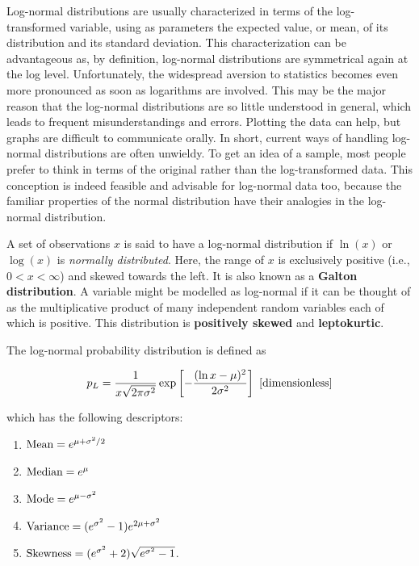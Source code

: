 \documentclass[a4paper,10pt]{article}
\begin{document}
{\noindent}Log-normal distributions are usually characterized in terms of the log-transformed variable, using as parameters the expected value, or mean, of its distribution and its standard deviation. This characterization can be advantageous as, by definition, log-normal distributions are symmetrical again at the log level. Unfortunately, the widespread aversion to statistics becomes even more pronounced as soon as logarithms are involved. This may be the major reason that the log-normal distributions are so little understood in general, which leads to frequent misunderstandings and errors. Plotting the data can help, but graphs are difficult to communicate orally. In short, current ways of handling log-normal distributions are often unwieldy. To get an idea of a sample, most people prefer to think in terms of the original rather than the log-transformed data. This conception is indeed feasible and advisable for log-normal data too, because the familiar properties of the normal distribution have their analogies in the log-normal distribution.

{\noindent}A set of observations $x$ is said to have a log-normal distribution if $\ln(x)$ or $\log(x)$ is \textit{normally distributed}. Here, the range of $x$ is exclusively positive (i.e., $0<x<\infty$) and skewed towards the left. It is also known as a \textbf{Galton distribution}. A variable might be modelled as log-normal if it can be thought of as the multiplicative product of many independent random variables each of which is positive. This distribution is \textbf{positively skewed} and \textbf{leptokurtic}.

{\noindent}The log-normal probability distribution is defined as

\begin{align*}
    p_L = \frac{1}{x\sqrt{2\pi\sigma^2}} \exp \left[-\frac{(\ln x-\mu)^2}{2\sigma^2}\right] ~ [{\rm dimensionless}]
\end{align*}

{\noindent}which has the following descriptors:

\begin{enumerate}
    \item ${\rm Mean} = e^{\mu+\sigma^2/2}$
    \item ${\rm Median} = e^\mu$
    \item ${\rm Mode} = e^{\mu-\sigma^2}$
    \item ${\rm Variance} = (e^{\sigma^2}-1)e^{2\mu+\sigma^2}$
    \item ${\rm Skewness} = (e^{\sigma^2}+2)\sqrt{e^{\sigma^2}-1}$.
\end{enumerate}
\end{document}
